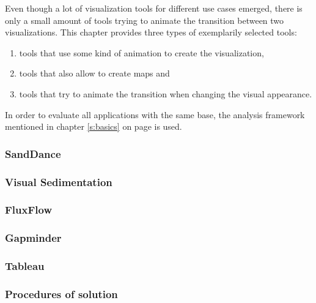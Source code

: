 Even though a lot of visualization tools for different use cases emerged, there is only a small amount of tools trying to animate the transition between two visualizations. This chapter provides three types of exemplarily selected tools:

\begin{enumerate}
\item tools that use some kind of animation to create the visualization,
\item tools that also allow to create maps and
\item tools that try to animate the transition when changing the visual appearance.
\end{enumerate}

In order to evaluate all applications with the same base, the analysis framework mentioned in chapter \ref{s:basics} on page \pageref{s:basics} is used.

\subsubsection{SandDance}


\subsubsection{Visual Sedimentation}


\subsubsection{FluxFlow}


\subsubsection{Gapminder}


\subsubsection{Tableau}


\subsubsection{Procedures of solution}
